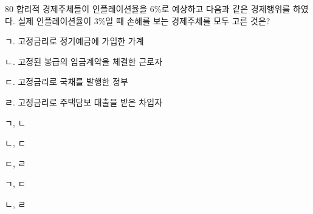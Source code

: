 \begin{question}{80}
합리적 경제주체들이 인플레이션율을 6\%로 예상하고 다음과 같은 경제행위를 하였다. 실제 인플레이션율이 3\%일 때 손해를 보는 경제주체를 모두 고른 것은?
\begin{framedtext}
ㄱ. 고정금리로 정기예금에 가입한 가계 \par
ㄴ. 고정된 봉급의 임금계약을 체결한 근로자 \par
ㄷ. 고정금리로 국채를 발행한 정부 \par
ㄹ. 고정금리로 주택담보 대출을 받은 차입자
\end{framedtext}
\begin{choices}
  \item ㄱ, ㄴ
  \item ㄴ, ㄷ
  \item ㄷ, ㄹ
  \item ㄱ, ㄷ
  \item ㄴ, ㄹ
\end{choices}
\end{question}
